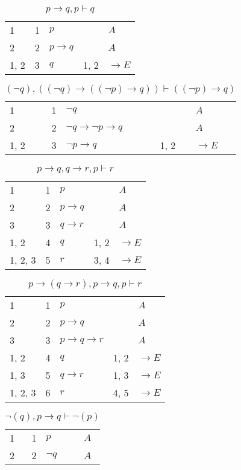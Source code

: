 \documentclass{article}
\begin{document}
\begin{table}[htbp]\caption*{$p→q,p ⊢ q$}\centering\begin{tabular}{lrlll}
{1} & 1 & $p$ & {} & $A$ \\
{2} & 2 & $p→q$ & {} & $A$ \\
{1, 2} & 3 & $q$ & {1, 2} & $→E$ \\
\end{tabular}
\end{table}\begin{table}[htbp]\caption*{$(¬q),((¬q)→((¬p)→q)) ⊢ ((¬p)→q)$}\centering\begin{tabular}{lrlll}
{1} & 1 & $¬q$ & {} & $A$ \\
{2} & 2 & $¬q→ ¬p→q$ & {} & $A$ \\
{1, 2} & 3 & $¬p→q$ & {1, 2} & $→E$ \\
\end{tabular}
\end{table}\begin{table}[htbp]\caption*{$p→q,q→r,p ⊢ r$}\centering\begin{tabular}{lrlll}
{1} & 1 & $p$ & {} & $A$ \\
{2} & 2 & $p→q$ & {} & $A$ \\
{3} & 3 & $q→r$ & {} & $A$ \\
{1, 2} & 4 & $q$ & {1, 2} & $→E$ \\
{1, 2, 3} & 5 & $r$ & {3, 4} & $→E$ \\
\end{tabular}
\end{table}\begin{table}[htbp]\caption*{$p→(q→r),p→q,p ⊢ r$}\centering\begin{tabular}{lrlll}
{1} & 1 & $p$ & {} & $A$ \\
{2} & 2 & $p→q$ & {} & $A$ \\
{3} & 3 & $p→q→r$ & {} & $A$ \\
{1, 2} & 4 & $q$ & {1, 2} & $→E$ \\
{1, 3} & 5 & $q→r$ & {1, 3} & $→E$ \\
{1, 2, 3} & 6 & $r$ & {4, 5} & $→E$ \\
\end{tabular}
\end{table}\begin{table}[htbp]\caption*{$¬(q),p→q ⊢ ¬(p)$}\centering\begin{tabular}{lrlll}
{1} & 1 & $p$ & {} & $A$ \\
{2} & 2 & $¬q$ & {} & $A$ \\

\end{tabular}
\end{table}
\end{document}
